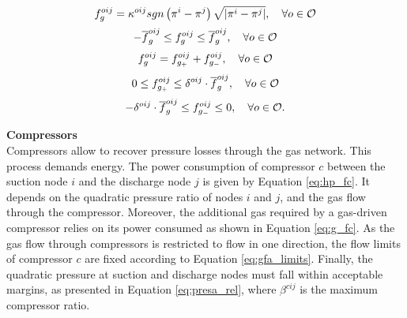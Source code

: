\begin{equation}
{f}^{oij}_{g} = {{\kappa}^{oij}} sgn \left(\pi^{i}-\pi^{j}\right) {\sqrt{\left|\pi^{i}-\pi^{j}\right|}}, \quad \forall o \in {\cal{O}}
\label{eq:wey}
\end{equation}
\begin{equation}
 - \overline{f}^{oij}_{g}  \le f^{oij}_{g} \le  \overline{f}^{oij}_{g},  \quad \forall o \in {\cal{O}}
\label{fgo_limits}
\end{equation}
\begin{equation}
{f}^{oij}_{g} =  f^{oij}_{g_+} + {f}^{oij}_{g_-}, \quad \forall o \in {\cal{O}}
\label{eq:fgo}
\end{equation}
\begin{equation}
0 \le f^{oij}_{g_+} \le \delta^{oij} \cdot \overline{f}^{oij}_{g}, \quad \forall o \in {\cal{O}}
\label{eq:fgopos_limits}
\end{equation}
\begin{equation}
- \delta^{oij} \cdot \overline{f}^{oij}_{g} \le f^{oij}_{g_-} \le 0, \quad \forall o \in {\cal{O}}.
\label{eq:fgoneg_limits}
\end{equation}

\noindent \textbf{Compressors}\\

Compressors allow to recover pressure losses through the gas network. This process demands energy. The power consumption of compressor $c$ between the suction node $i$ and the discharge node $j$ is given by Equation \ref{eq:hp_fc}. It depends on the quadratic pressure ratio of nodes $i$ and $j$, and the gas flow through the compressor. Moreover, the additional gas required by a gas-driven compressor relies on its power consumed as shown in Equation \ref{eq:g_fc}. As the gas flow through compressors is restricted to flow in one direction, the flow limits of compressor $c$ are fixed according to Equation \ref{eq:gfa_limits}. Finally, the quadratic pressure at suction and discharge nodes must fall within acceptable margins, as presented in Equation \ref{eq:presa_rel}, where $\beta^{cij}$ is the maximum compressor ratio.\\

